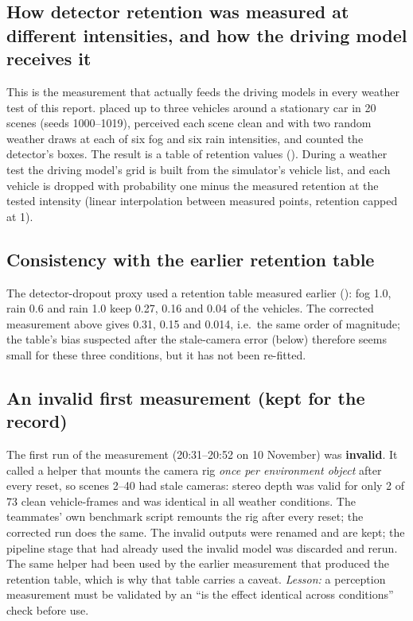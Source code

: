 \subsection{How detector retention was measured at different intensities, and how the driving model receives it}
This is the measurement that actually feeds the driving models in every weather test of this report.  placed up to three vehicles around a stationary car in 20 scenes (seeds 1000--1019), perceived each scene clean and with two random weather draws at each of six fog and six rain intensities, and counted the detector's boxes. The result is a table of retention values (). During a weather test the driving model's grid is built from the simulator's vehicle list, and each vehicle is dropped with probability one minus the measured retention at the tested intensity (linear interpolation between measured points, retention capped at 1).


\subsection{Consistency with the earlier retention table}
The detector-dropout proxy used a retention table measured earlier (): fog 1.0, rain 0.6 and rain 1.0 keep 0.27, 0.16 and 0.04 of the vehicles. The corrected measurement above gives 0.31, 0.15 and 0.014, i.e.\ the same order of magnitude;
the table's bias suspected after the stale-camera error (below) therefore seems small for these three conditions, but it has not been re-fitted.

\subsection{An invalid first measurement (kept for the record)}
The first run of the measurement (20:31--20:52 on 10 November) was \textbf{invalid}. It called a helper that mounts the camera rig \emph{once per environment object} after every reset, so scenes 2--40 had stale cameras: stereo depth was valid for only 2 of 73 clean vehicle-frames and was identical in all weather conditions.
The teammates' own benchmark script remounts the rig after every reset; the corrected run does the same. The invalid outputs were renamed  and are kept; the pipeline stage that had already used the invalid model was discarded and rerun. The same helper had been used by the earlier measurement that produced the retention table, which is why that table carries a caveat.
\emph{Lesson:} a perception measurement must be validated by an ``is the effect identical across conditions'' check before use.

